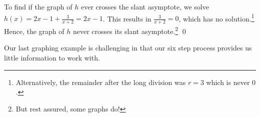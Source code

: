 \begin{ex}
\begin{figure}
\begin{center}
\caption{}
\label{fig:hxeqtwoxcubedetc}
\end{center}

\end{figure}

To find if the graph of $h$ ever crosses the slant asymptote, we solve $h(x) = 2x-1+\frac{3}{x+2}= 2x-1$.  This results in $\frac{3}{x+2} = 0$, which has no solution.\footnote{Alternatively, the remainder after the long division was $r=3$ which is never $0$.} Hence, the graph of $h$ never crosses its slant asymptote.\footnote{But rest assured, some graphs do!}
\qed


\end{ex}

Our last graphing example is challenging in that our six step process provides us little information to work with.

